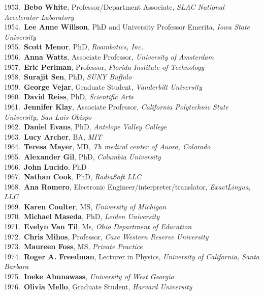 1953.~{\bf Bebo White}, Professor/Department Associate, {\sl SLAC National Accelerator Laboratory} \\
1954.~{\bf Lee Anne Willson}, PhD and University Professor Emerita, {\sl Iowa State University} \\
1955.~{\bf Scott Menor}, PhD, {\sl Roambotics, Inc.} \\
1956.~{\bf Anna Watts}, Associate Professor, {\sl University of Amsterdam } \\
1957.~{\bf Eric Perlman}, Professor, {\sl Florida Institute of Technology} \\
1958.~{\bf Surajit Sen}, PhD, {\sl SUNY Buffalo} \\
1959.~{\bf George Vejar}, Graduate Student, {\sl Vanderbilt University} \\
1960.~{\bf David Reiss}, PhD, {\sl Scientific Arts} \\
1961.~{\bf Jennifer Klay}, Associate Professor, {\sl California Polytechnic State University, San Luis Obispo} \\
1962.~{\bf Daniel Evans}, PhD, {\sl Antelope Valley College} \\
1963.~{\bf Lucy Archer}, BA, {\sl MIT} \\
1964.~{\bf Teresa Mayer}, MD, {\sl Th medical center of Auora, Colorado } \\
1965.~{\bf Alexander Gil}, PhD, {\sl Columbia University } \\
1966.~{\bf John Lucido}, PhD \\
1967.~{\bf Nathan Cook}, PhD, {\sl RadiaSoft LLC} \\
1968.~{\bf Ana Romero}, Electronic Engineer/interpreter/translator, {\sl ExactLingua, LLC} \\
1969.~{\bf Karen Coulter}, MS, {\sl University of Michigan } \\
1970.~{\bf Michael Maseda}, PhD, {\sl Leiden University} \\
1971.~{\bf Evelyn Van Til}, Ms, {\sl Ohio Department of Education} \\
1972.~{\bf Chris Mihos}, Professor, {\sl Case Western Reserve University} \\
1973.~{\bf Maureen Foss}, MS, {\sl Private Practice} \\
1974.~{\bf Roger A. Freedman}, Lecturer in Physics, {\sl University of California, Santa Barbara} \\
1975.~{\bf Ineke Abunawass}, {\sl University of West Georgia } \\
1976.~{\bf Olivia Mello}, Graduate Student, {\sl Harvard University} \\
